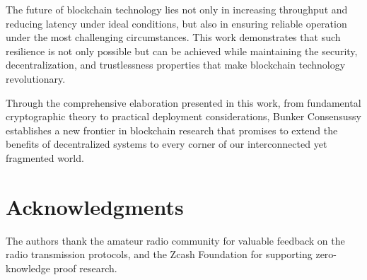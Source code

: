 \documentclass[11pt,a4paper]{article}
\begin{document}
The future of blockchain technology lies not only in increasing throughput and reducing latency under ideal conditions, but also in ensuring reliable operation under the most challenging circumstances. This work demonstrates that such resilience is not only possible but can be achieved while maintaining the security, decentralization, and trustlessness properties that make blockchain technology revolutionary.

Through the comprehensive elaboration presented in this work, from fundamental cryptographic theory to practical deployment considerations, Bunker Consensussy establishes a new frontier in blockchain research that promises to extend the benefits of decentralized systems to every corner of our interconnected yet fragmented world.

\section*{Acknowledgments}

The authors thank the amateur radio community for valuable feedback on the radio transmission protocols, and the Zcash Foundation for supporting zero-knowledge proof research.
\end{document}
